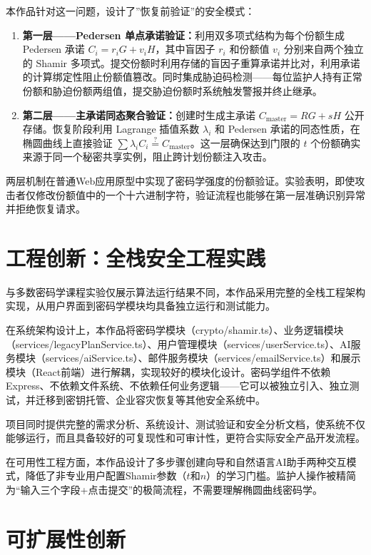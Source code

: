 \documentclass[UTF8,a4paper,zihao=-4,openany]{ctexrep}
\begin{document}
本作品针对这一问题，设计了”恢复前验证”的安全模式：
\begin{enumerate}
  \item \textbf{第一层——Pedersen 单点承诺验证：}利用双多项式结构为每个份额生成 Pedersen 承诺 $C_i = r_iG + v_iH$，其中盲因子 $r_i$ 和份额值 $v_i$ 分别来自两个独立的 Shamir 多项式。提交份额时利用存储的盲因子重算承诺并比对，利用承诺的计算绑定性阻止份额值篡改。同时集成胁迫码检测——每位监护人持有正常份额和胁迫份额两组值，提交胁迫份额时系统触发警报并终止继承。
  \item \textbf{第二层——主承诺同态聚合验证：}创建时生成主承诺 $C_{\text{master}} = RG + sH$ 公开存储。恢复阶段利用 Lagrange 插值系数 $\lambda_i$ 和 Pedersen 承诺的同态性质，在椭圆曲线上直接验证 $\sum \lambda_i C_i \stackrel{?}{=} C_{\text{master}}$。这一层确保达到门限的 $t$ 个份额确实来源于同一个秘密共享实例，阻止跨计划份额注入攻击。
\end{enumerate}

两层机制在普通Web应用原型中实现了密码学强度的份额验证。实验表明，即使攻击者仅修改份额值中的一个十六进制字符，验证流程也能够在第一层准确识别异常并拒绝恢复请求。

\section{工程创新：全栈安全工程实践}

与多数密码学课程实验仅展示算法运行结果不同，本作品采用完整的全栈工程架构实现，从用户界面到密码学模块均具备独立运行和测试能力。

在系统架构设计上，本作品将密码学模块（crypto/shamir.ts）、业务逻辑模块（services/legacyPlanService.ts）、用户管理模块（services/userService.ts）、AI服务模块（services/aiService.ts）、邮件服务模块（services/emailService.ts）和展示模块（React前端）进行解耦，实现较好的模块化设计。密码学组件不依赖Express、不依赖文件系统、不依赖任何业务逻辑——它可以被独立引入、独立测试，并迁移到密钥托管、企业容灾恢复等其他安全系统中。

项目同时提供完整的需求分析、系统设计、测试验证和安全分析文档，使系统不仅能够运行，而且具备较好的可复现性和可审计性，更符合实际安全产品开发流程。

在可用性工程方面，本作品设计了多步骤创建向导和自然语言AI助手两种交互模式，降低了非专业用户配置Shamir参数（$t$和$n$）的学习门槛。监护人操作被精简为“输入三个字段+点击提交”的极简流程，不需要理解椭圆曲线密码学。

\section{可扩展性创新}
\end{document}
